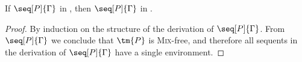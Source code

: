 \begin{theorem}\label{thm:hcp2cp-typing}
  If $\seq[P]{\Gamma}$ in \hcp, then $\seq[P]{\Gamma}$ in \cp.
\end{theorem}
\begin{proof}
  By induction on the structure of the derivation of $\seq[P]{\Gamma}$.
  From $\seq[P]{\Gamma}$ we conclude that $\tm{P}$ is \textsc{Mix}-free, and
  therefore all sequents in the derivation of $\seq[P]{\Gamma}$ have a single
  environment.
\end{proof}

